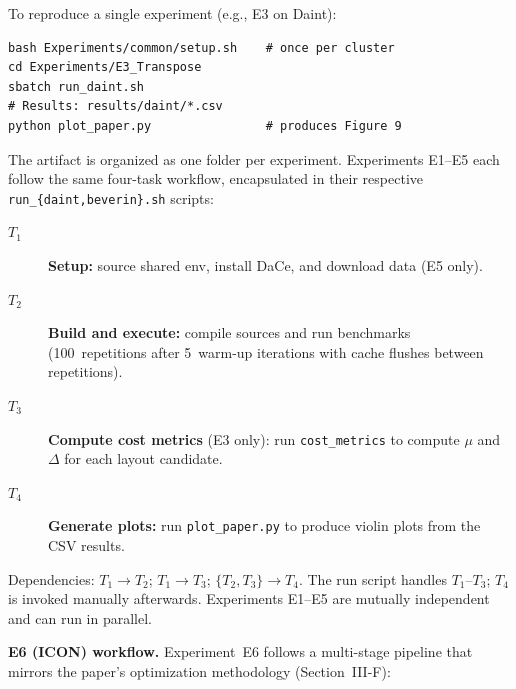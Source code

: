 \documentclass[conference]{IEEEtran}
\begin{document}
\noindent To reproduce a single experiment (e.g., E3 on Daint):
\begin{verbatim}
bash Experiments/common/setup.sh    # once per cluster
cd Experiments/E3_Transpose
sbatch run_daint.sh
# Results: results/daint/*.csv
python plot_paper.py                # produces Figure 9
\end{verbatim}

\artcomp

The artifact is organized as one folder per experiment.
Experiments E1--E5 each follow the same four-task workflow, encapsulated in their respective \texttt{run\_\{daint,beverin\}.sh} scripts:

\begin{description}
\item[$T_1$] \textbf{Setup:} source shared env, install DaCe, and download data (E5 only).
\item[$T_2$] \textbf{Build and execute:} compile sources and run benchmarks (100~repetitions after 5~warm-up iterations with cache flushes between repetitions).
\item[$T_3$] \textbf{Compute cost metrics} (E3 only): run \texttt{cost\_metrics} to compute $\mu$ and~$\Delta$ for each layout candidate.
\item[$T_4$] \textbf{Generate plots:} run \texttt{plot\_paper.py} to produce violin plots from the CSV results.
\end{description}

\noindent Dependencies: $T_1 \to T_2$; $T_1 \to T_3$; $\{T_2, T_3\} \to T_4$.
The run script handles $T_1$--$T_3$; $T_4$ is invoked manually afterwards.
Experiments E1--E5 are mutually independent and can run in parallel.

\textbf{E6 (ICON) workflow.}
Experiment~E6 follows a multi-stage pipeline that mirrors the paper's optimization methodology (Section~III-F):
\end{document}
